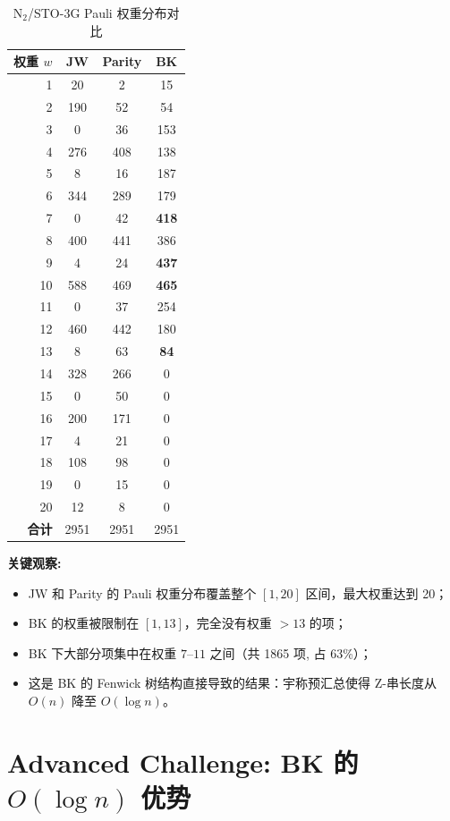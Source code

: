 \documentclass[fontset=mac]{ctexart}
\begin{document}
\begin{table}[H]
\centering
\small
\begin{tabular}{rccc}
\toprule
\textbf{权重 $w$} & \textbf{JW} & \textbf{Parity} & \textbf{BK} \\
\midrule
 1 & 20 & 2 & 15 \\
 2 & 190 & 52 & 54 \\
 3 & 0 & 36 & 153 \\
 4 & 276 & 408 & 138 \\
 5 & 8 & 16 & 187 \\
 6 & 344 & 289 & 179 \\
 7 & 0 & 42 & \textbf{418} \\
 8 & 400 & 441 & 386 \\
 9 & 4 & 24 & \textbf{437} \\
10 & 588 & 469 & \textbf{465} \\
11 & 0 & 37 & 254 \\
12 & 460 & 442 & 180 \\
13 & 8 & 63 & \textbf{84} \\
14 & 328 & 266 & 0 \\
15 & 0 & 50 & 0 \\
16 & 200 & 171 & 0 \\
17 & 4 & 21 & 0 \\
18 & 108 & 98 & 0 \\
19 & 0 & 15 & 0 \\
20 & 12 & 8 & 0 \\
\midrule
\textbf{合计} & 2951 & 2951 & 2951 \\
\bottomrule
\end{tabular}
\caption{N$_2$/STO-3G Pauli 权重分布对比}
\end{table}

\textbf{关键观察:}
\begin{itemize}
    \item JW 和 Parity 的 Pauli 权重分布覆盖整个 $[1,20]$ 区间，最大权重达到 20；
    \item BK 的权重被限制在 $[1,13]$，完全没有权重 $>13$ 的项；
    \item BK 下大部分项集中在权重 $7$--$11$ 之间（共 1865 项, 占 63\%）；
    \item 这是 BK 的 Fenwick 树结构直接导致的结果：宇称预汇总使得 Z-串长度从 $O(n)$ 降至 $O(\log n)$。
\end{itemize}

\section*{Advanced Challenge: BK 的 $O(\log n)$ 优势}
\end{document}
